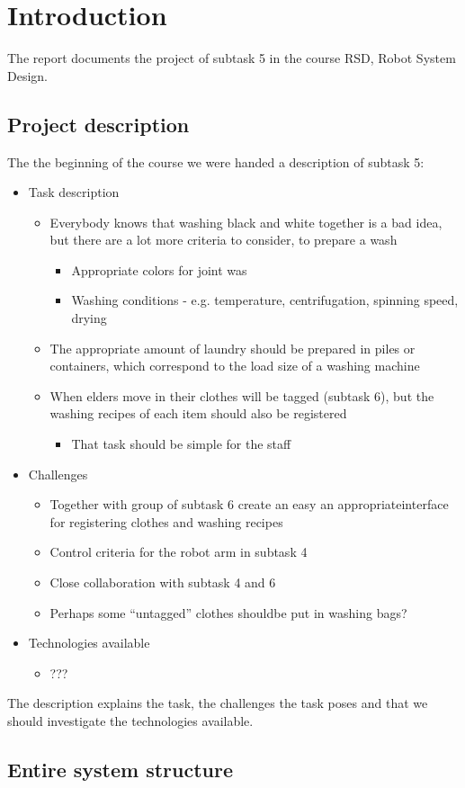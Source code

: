 \section{Introduction}

The report documents the project of subtask 5 in the course RSD, Robot System Design.

\subsection{Project description}

The the beginning of the course we were handed a description of subtask 5:

\begin{itemize}
\item Task description
	\begin{itemize}
	\item Everybody knows that washing black and white together is a bad idea, but there are a lot more criteria to consider, to prepare a wash
		\begin{itemize}
		\item Appropriate colors for joint was
		\item Washing conditions - e.g. temperature, centrifugation, spinning speed, drying
		\end{itemize}
	\item The appropriate amount of laundry should be prepared in piles or containers, which correspond to the load size of a washing machine
	\item When elders move in their clothes will be tagged (subtask 6), but the washing recipes of each item should also be registered
		\begin{itemize}
		\item That task should be simple for the staff
		\end{itemize}
	\end{itemize}
\item Challenges
	\begin{itemize}
	\item Together with group of subtask 6 create an easy an appropriateinterface for registering clothes and washing recipes
	\item Control criteria for the robot arm in subtask 4
	\item Close collaboration with subtask 4 and 6
	\item Perhaps some “untagged” clothes shouldbe put in washing bags?
	\end{itemize}
\item Technologies available
	\begin{itemize}
	\item ???
	\end{itemize}
\end{itemize}

The description explains the task, the challenges the task poses and that we should investigate the technologies available.

\subsection{Entire system structure}